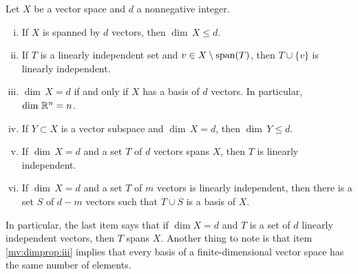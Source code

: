\begin{prop} \label{mv:dimprop}
\pagebreak[2]
Let $X$ be a vector space and $d$ a nonnegative integer.
\begin{enumerate}[(i)]
\item \label{mv:dimprop:i}
If $X$ is spanned by $d$ vectors, then $\dim \, X \leq d$.
\item \label{mv:dimprop:ii}
If $T$ is a linearly independent set and
$v \in X \setminus \operatorname{span} (T)$, then
$T \cup \{ v \}$ is linearly independent.
\item \label{mv:dimprop:iii}
$\dim \, X = d$ if and only if $X$ has a basis of $d$
vectors.
In particular, $\dim \, {\mathbb{R}}^n = n$.
\item \label{mv:dimprop:iv}
If $Y \subset X$ is a vector subspace and $\dim \, X = d$,
then $\dim \, Y \leq d$.
\item \label{mv:dimprop:v}
If $\dim \, X = d$ and a set $T$ of $d$ vectors spans $X$,
then $T$ is linearly independent.
\item \label{mv:dimprop:vi}
If $\dim \, X = d$ and a set $T$ of $m$ vectors is
linearly independent, then there is a set $S$ of $d-m$
vectors such that $T \cup S$ is a basis of $X$.
\end{enumerate}
\end{prop}

In particular, the last item says that if $\dim X = d$ and $T$ is
a set of $d$ linearly independent vectors, then $T$ spans $X$.
Another thing to note is that item \ref{mv:dimprop:iii} implies that every
basis of a finite-dimensional vector space has the same number of elements.

